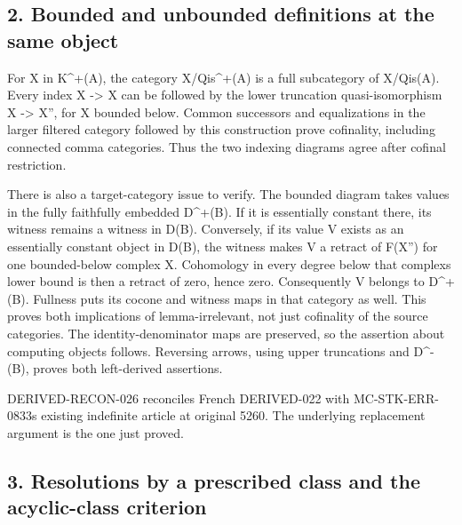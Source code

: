 \documentclass[11pt]{article}
\begin{document}
\subsection{2. Bounded and unbounded definitions at the same object}\label{proofs-5091-5900-bounded-and-unbounded-definitions-at-the-same-object}

For X in K\textasciicircum{}\allowbreak{}+(A)\allowbreak{},\allowbreak{} the category X/\allowbreak{}Qis\textasciicircum{}\allowbreak{}+(A)\allowbreak{} is a full subcategory of X/\allowbreak{}Qis(A)\allowbreak{}. Every index X \allowbreak{}-> X\textquotesingle{} can be followed by the lower truncation quasi-isomorphism X\textquotesingle{} \allowbreak{}-> X'',\allowbreak{} for X\textquotesingle\textquotesingle{} bounded below. Common successors and equalizations in the larger filtered category followed by this construction prove cofinality,\allowbreak{} including connected comma categories. Thus the two indexing diagrams agree after cofinal restriction.

There is also a target-category issue to verify. The bounded diagram takes values in the fully faithfully embedded D\textasciicircum{}\allowbreak{}+(B)\allowbreak{}. If it is essentially constant there,\allowbreak{} its witness remains a witness in D(B)\allowbreak{}. Conversely,\allowbreak{} if its value V exists as an essentially constant object in D(B)\allowbreak{},\allowbreak{} the witness makes V a retract of F(X'')\allowbreak{} for one bounded-below complex X\textquotesingle\textquotesingle. Cohomology in every degree below that complex\textquotesingle s lower bound is then a retract of zero,\allowbreak{} hence zero. Consequently V belongs to D\textasciicircum{}\allowbreak{}+(B)\allowbreak{}. Fullness puts its cocone and witness maps in that category as well. This proves both implications of lemma-irrelevant,\allowbreak{} not just cofinality of the source categories. The identity-denominator maps are preserved,\allowbreak{} so the assertion about computing objects follows. Reversing arrows,\allowbreak{} using upper truncations and D\textasciicircum{}-(B)\allowbreak{},\allowbreak{} proves both left-derived assertions.

DERIVED-RECON-026 reconciles French DERIVED-022 with MC-STK-ERR-0833\textquotesingle s existing indefinite article at original 5260. The underlying replacement argument is the one just proved.

\subsection{3. Resolutions by a prescribed class and the acyclic-class criterion}\label{proofs-5091-5900-resolutions-by-a-prescribed-class-and-the-acyclic-class-criterion}
\end{document}

